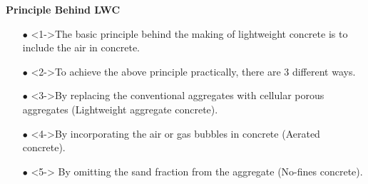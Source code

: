 \documentclass[aspectratio=169]{beamer}
\begin{document}
  \begin{frame}{\textbf{Principle Behind LWC}}
      \begin{itemize}
          \large\item[$\bullet$] <1->The basic principle behind the making of lightweight concrete is to include the air in concrete.
           \vspace{0.4cm}
          \large\item[$\bullet$]<2->To achieve the above principle practically, there are 3 different ways.
           \vspace{0.4cm}
          \large\item[$\bullet$] <3->By replacing the conventional aggregates with cellular porous aggregates
(Lightweight aggregate concrete).
         \vspace{0.4cm}
         \item[$\bullet$]<4->By incorporating the air or gas bubbles in concrete (Aerated concrete).
         \vspace{0.4cm}
         \item[$\bullet$]<5-> By omitting the sand fraction from the aggregate (No-fines concrete).
          \end{itemize}
  \end{frame}
\end{document}
